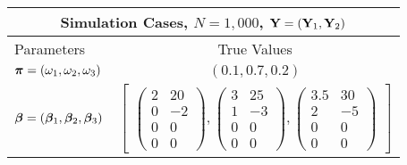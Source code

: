 \documentclass{interact}
\theoremstyle{plain}
\theoremstyle{definition}
\theoremstyle{remark}
\begin{document}
\begin{table}[h!]
\centering
    \begin{tabular}{ |p{4cm}||p{5.5cm}|p{6cm}|}
    \hline
    \multicolumn{3}{|c|}{Simulation Cases, $N=1,000$, $\mathbf{Y}=(\mathbf{Y}_1,\mathbf{Y}_2)$} \\
    \hline
    Parameters& \multicolumn{2}{|c|}{True Values} \\
    \hline
    $\bm{\pi}=(\omega_1,\omega_2,\omega_3)$   &\multicolumn{2}{|c|}{$(0.1,0.7,0.2)$}\\
    ${\bm \beta}=({\bm \beta}_1,{\bm \beta}_2,{\bm \beta}_3)$   &\multicolumn{2}{|c|}{$\begin{bmatrix}\begin{pmatrix}
        2 & 20\\
        0 & -2\\
        0 & 0 \\
        0 & 0
       \end{pmatrix},
       \begin{pmatrix}
        3 & 25\\
        1 & -3\\
        0 & 0\\
        0 & 0
        \end{pmatrix},
        \begin{pmatrix}
        3.5 & 30\\
        2   & -5\\
        0 & 0\\
        0 & 0
        \end{pmatrix}\end{bmatrix}$}\\
        

\end{tabular}
\end{table}
\end{document}
